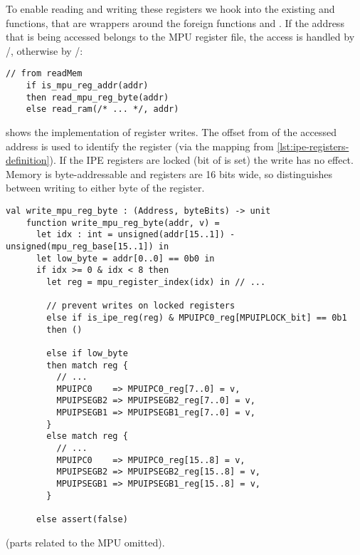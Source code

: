 To enable reading and writing these registers we hook into the existing  and  functions, that are wrappers around the foreign functions  and . If the address that is being accessed belongs to the MPU register file, the access is handled by /, otherwise by /:
\begin{lstlisting}[language=sail]
    // from readMem
    if is_mpu_reg_addr(addr)
    then read_mpu_reg_byte(addr)
    else read_ram(/* ... */, addr)
\end{lstlisting}

\noindent
{} shows %
the implementation of register writes. The offset from  of the accessed address is used to identify the register (via the  mapping from \cref{lst:ipe-registers-definition}). If the IPE registers are locked (\ie bit  of  is set) the write has no effect. Memory is byte-addressable and registers are 16 bits wide, so  distinguishes between writing to either byte of the register.

\begin{listing}[t]
  \begin{lstlisting}[language=sail]
    val write_mpu_reg_byte : (Address, byteBits) -> unit
    function write_mpu_reg_byte(addr, v) =
      let idx : int = unsigned(addr[15..1]) - unsigned(mpu_reg_base[15..1]) in
      let low_byte = addr[0..0] == 0b0 in
      if idx >= 0 & idx < 8 then
        let reg = mpu_register_index(idx) in // ...

        // prevent writes on locked registers
        else if is_ipe_reg(reg) & MPUIPC0_reg[MPUIPLOCK_bit] == 0b1
        then ()

        else if low_byte
        then match reg {
          // ...
          MPUIPC0    => MPUIPC0_reg[7..0] = v,
          MPUIPSEGB2 => MPUIPSEGB2_reg[7..0] = v,
          MPUIPSEGB1 => MPUIPSEGB1_reg[7..0] = v,
        }
        else match reg {
          // ...
          MPUIPC0    => MPUIPC0_reg[15..8] = v,
          MPUIPSEGB2 => MPUIPSEGB2_reg[15..8] = v,
          MPUIPSEGB1 => MPUIPSEGB1_reg[15..8] = v,
        }

      else assert(false)
  \end{lstlisting}
  \caption{{ (parts related to the MPU omitted).}}
  \label{lst:write_mpu_reg_byte}
\end{listing}

